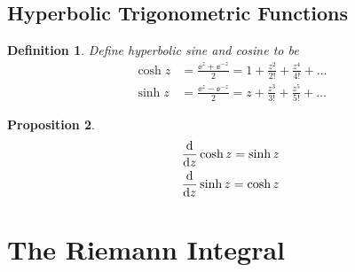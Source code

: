 \documentclass{article}
\theoremstyle{plain}\theoremheaderfont{\normalfont\itshape}\theorembodyfont{\rmfamily}\theoremseparator{.}\newtheorem*{rem}{Remark}\newtheorem*{ex}{Example}\newtheorem*{proof}{Proof}\newtheorem*{altp}{Alternative proof}
\theoremstyle{plain}\theoremheaderfont{\normalfont\bfseries}\theorembodyfont{\rmfamily}\theoremseparator{.}\newtheorem{thm}{Theorem}[section]\newtheorem{lem}[thm]{Lemma}\newtheorem{prop}[thm]{Proposition}\newtheorem*{cor}{Corollary}\newtheorem{defn}[thm]{Definition}\newtheorem{clm}[thm]{Claim}\newtheorem{clminproof}{Claim}
\theoremstyle{break}\theoremheaderfont{\normalfont\itshape}\theorembodyfont{\rmfamily}\theoremseparator{.\medskip}\newtheorem*{proofskip}{Proof}\newtheorem*{exs}{Examples}\newtheorem*{rems}{Remarks}
\theoremstyle{break}\theoremheaderfont{\normalfont\bfseries}\theorembodyfont{\rmfamily}\theoremseparator{.\medskip}\newtheorem{lemskip}[thm]{Lemma}\newtheorem{defnskip}[thm]{Definition}\newtheorem{propskip}[thm]{Proposition}\newtheorem{thmskip}[thm]{Theorem}
\newcommand{\ee}{\mathrm{e}}
\begin{document}
    \subsection{Hyperbolic Trigonometric Functions}
    \begin{defn}
        Define hyperbolic sine and cosine to be
        \begin{align*}
            \cosh z&=\frac{\ee^z+\ee^{-z}}{2}=1+\frac{z^2}{2!}+\frac{z^4}{4!}+\dots\\
            \sinh z&=\frac{\ee^z-\ee^{-z}}{2}=z+\frac{z^3}{3!}+\frac{z^5}{5!}+\dots
        \end{align*}
    \end{defn}
    \begin{prop}
        \begin{align*}
            &\dv{z}\cosh z=\sinh z\\
            &\dv{z}\sinh z=\cosh z
        \end{align*}
    \end{prop}
    \section{The Riemann Integral}
\end{document}

